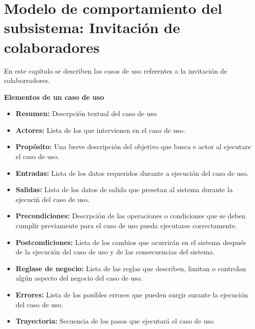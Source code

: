 \chapter{Modelo de comportamiento del subsistema: Invitación de colaboradores}
\label{cap:reqSist}

En este capítulo se describen los casos de uso referentes a la invitación de colaborradores.


\begin{shaded}
		\textcolor{NavyBlue}{\Large\textbf{Elementos de un caso de uso}}
		\begin{itemize}
			\item \textbf{Resumen:} Descrpción textual del caso de uso
			\item \textbf{Actores:} Lista de los que  intervienen en el caso de uso.
			\item \textbf{Propósito:} Una breve descripción del objetivo que busca e actor al ejecutare el caso de uso.
			\item \textbf{Entradas:} Lista de los datos requeridos durante a ejecución del caso de uso.
			\item \textbf{Salidas:} Lista de los datos de salida que presetan al sistema durante la ejecuciń del caso de uso.
			\item \textbf{Precondiciones:} Descrpción de las operaciones o condiciones que se deben cumplir previamente para el caso de uso pueda ejecutarse correctamente.
			\item \textbf{Postcondiciones:} Lista de los cambios que ocurrirán en el sistema después de la ejecución del caso de uso y de las consecuencias del sistema.
			\item \textbf{Reglase de negocio:} Lista de las reglas que describen, limitan o controlan algún aspecto del negocio del caso de uso.
			\item \textbf{Errores:} Lista de los posibles errores que pueden surgir surante la ejecución del caso de uso.
			\item \textbf{Trayectoria:} Secuencia de los pasos que ejecutará el caso de uso
		\end{itemize}		
	\end{shaded}
\newpage




